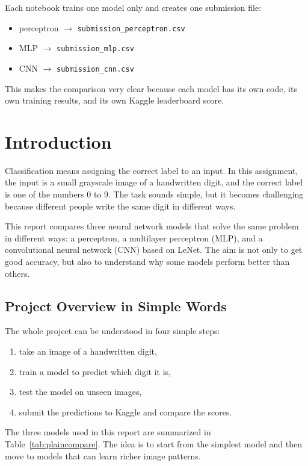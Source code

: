\documentclass[11pt]{article}
\begin{document}
Each notebook trains one model only and creates one submission file:
\begin{itemize}
    \item perceptron $\rightarrow$ \texttt{submission\_\allowbreak perceptron.csv}
    \item MLP $\rightarrow$ \texttt{submission\_\allowbreak mlp.csv}
    \item CNN $\rightarrow$ \texttt{submission\_\allowbreak cnn.csv}
\end{itemize}

This makes the comparison very clear because each model has its own code, its own training results, and its own Kaggle leaderboard score.

\section{Introduction}

Classification means assigning the correct label to an input. In this assignment, the input is a small grayscale image of a handwritten digit, and the correct label is one of the numbers 0 to 9. The task sounds simple, but it becomes challenging because different people write the same digit in different ways.

This report compares three neural network models that solve the same problem in different ways: a perceptron, a multilayer perceptron (MLP), and a convolutional neural network (CNN) based on LeNet. The aim is not only to get good accuracy, but also to understand why some models perform better than others.

\subsection{Project Overview in Simple Words}

The whole project can be understood in four simple steps:
\begin{enumerate}
    \item take an image of a handwritten digit,
    \item train a model to predict which digit it is,
    \item test the model on unseen images,
    \item submit the predictions to Kaggle and compare the scores.
\end{enumerate}

The three models used in this report are summarized in Table~\ref{tab:plaincompare}. The idea is to start from the simplest model and then move to models that can learn richer image patterns.
\end{document}
